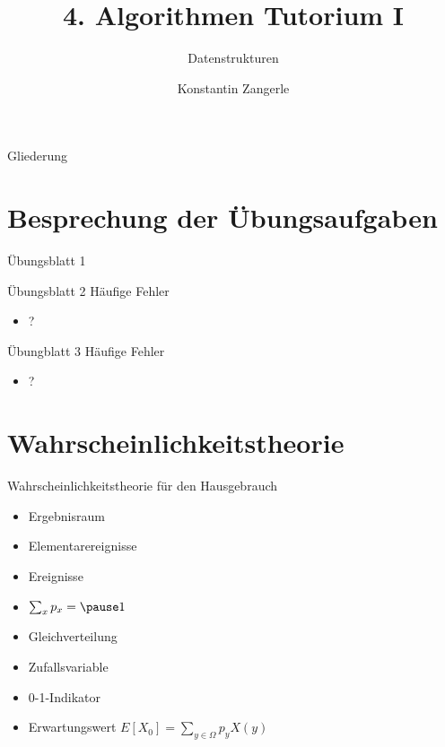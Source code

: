 \documentclass[18pt]{beamer}
\title[Algo I Tut]{4. Algorithmen Tutorium I}
\subtitle{Datenstrukturen}
\author[Zangerle]{Konstantin Zangerle}
\institute{Institut für Theoretische Informatik}
\begin{document}

\begin{frame}
\titlepage
\end{frame}

\begin{frame}{Gliederung}
 \tableofcontents
\end{frame}


\section{Besprechung der Übungsaufgaben}
\begin{frame}{Übungsblatt 1}
\end{frame}

\begin{frame}[fragile]{Übungsblatt 2}
Häufige Fehler
\begin{itemize}
 \item ?
\end{itemize}
\end{frame}

\begin{frame}{Übungblatt 3}
Häufige Fehler
\begin{itemize}
 \item ?
\end{itemize}

\end{frame}

\section{Wahrscheinlichkeitstheorie}
\begin{frame}{Wahrscheinlichkeitstheorie für den Hausgebrauch}
 \begin{itemize}
  \item Ergebnisraum
  \item Elementarereignisse
  \item Ereignisse
  \item $\sum_x p_x = \pause 1$
  \item Gleichverteilung
  \item Zufallsvariable
  \item 0-1-Indikator
  \item Erwartungswert \pause $E[X_0] = \sum_{y \in \Omega} p_y X(y)$
 \end{itemize}

\end{frame}
\end{document}
